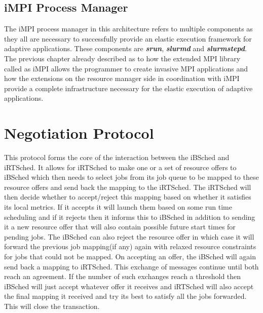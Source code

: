 \subsection{iMPI Process Manager}
The iMPI process manager in this architecture refers to multiple components as they all are necessary to successfully provide an elastic execution framework for adaptive applications. These components are \textbf{\textit{srun}}, \textbf{\textit{slurmd}} and \textbf{\textit{slurmstepd}}. The previous chapter already described as to how the extended MPI library called as iMPI allows the programmer to create invasive MPI applications and how the extensions on the resource manager side in coordination with iMPI provide a complete infrastructure necessary for the elastic execution of adaptive applications.
\section{Negotiation Protocol}
This protocol forms the core of the interaction between the iBSched and iRTSched. It allows for iRTSched to make one or a set of resource offers to iBSched which then needs to select jobs from its job queue to be mapped to these resource offers and send back the mapping to the iRTSched. The iRTSched will then decide whether to accept/reject this mapping based on whether it satisfies its local metrics. If it accepts it will launch them based on some run time scheduling and if it rejects then it informs this to iBSched in addition to sending it a new resource offer
that will also contain possible future start times for pending jobs. The iBSched can also reject the resource offer in which case it will forward the previous job mapping(if any) again with relaxed resource constraints for jobs that could not be mapped. On accepting an offer, the iBSched will again send back a mapping to iRTSched. This exchange of messages continue until both reach an agreement. If the number of such exchanges reach a threshold then iBSched will just accept whatever offer it receives and iRTSched will also accept the final mapping it received and try its best to satisfy all the jobs forwarded. This will close the transaction.
